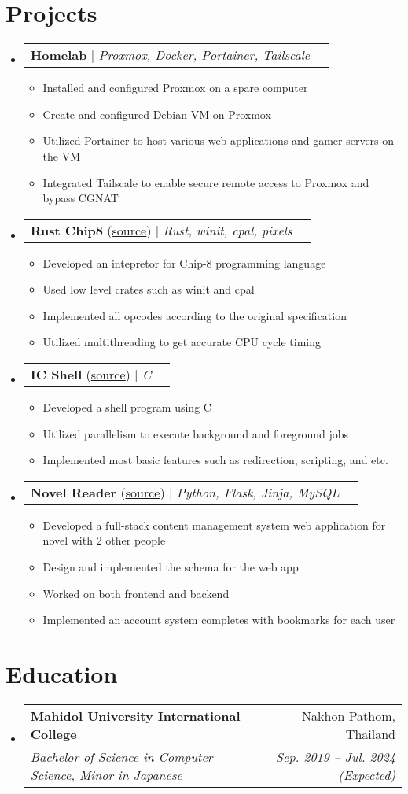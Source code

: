 \documentclass[letterpaper,11pt]{article}
\makeatletter
\newcommand{\resumeItem}[1]{
  \item\small{
    {#1 \vspace{-2pt}}
  }
}
\newcommand{\resumeSubheading}[4]{
  \vspace{-2pt}\item
    \begin{tabular*}{0.97\textwidth}[t]{l@{\extracolsep{\fill}}r}
      \textbf{#1} & #2 \\
      \textit{\small#3} & \textit{\small #4} \\
    \end{tabular*}\vspace{-7pt}
}
\newcommand{\resumeProjectHeading}[2]{
    \item
    \begin{tabular*}{0.97\textwidth}{l@{\extracolsep{\fill}}r}
      \small#1 & #2 \\
    \end{tabular*}\vspace{-7pt}
}
\newcommand{\resumeSubHeadingListStart}{\begin{itemize}[leftmargin=0.15in, label={}]}
\newcommand{\resumeSubHeadingListEnd}{\end{itemize}}
\newcommand{\resumeItemListStart}{\begin{itemize}}
\newcommand{\resumeItemListEnd}{\end{itemize}\vspace{-5pt}}
\makeatother
\begin{document}
\section{Projects}
    \resumeSubHeadingListStart
      \resumeProjectHeading
        {\textbf{Homelab} $|$ \emph{Proxmox, Docker, Portainer, Tailscale}}{}
        \resumeItemListStart
          \resumeItem{Installed and configured Proxmox on a spare computer}
          \resumeItem{Create and configured Debian VM on Proxmox}
          \resumeItem{Utilized Portainer to host various web applications and gamer servers on the VM }
          \resumeItem{Integrated Tailscale to enable secure remote access to Proxmox and bypass CGNAT}
        \resumeItemListEnd
      \resumeProjectHeading
        {\textbf{Rust Chip8} (\href{https://github.com/fordkuppp/rust-chip8}{\underline{source}}) $|$ \emph{Rust, winit, cpal, pixels}}{}
        \resumeItemListStart
          \resumeItem{Developed an intepretor for Chip-8 programming language}
          \resumeItem{Used low level crates such as winit and cpal}
          \resumeItem{Implemented all opcodes according to the original specification}
          \resumeItem{Utilized multithreading to get accurate CPU cycle timing}
        \resumeItemListEnd
      \resumeProjectHeading
        {\textbf{IC Shell} (\href{https://github.com/fordkuppp/icsh}{\underline{source}}) $|$ \emph{C}}{}
        \resumeItemListStart
          \resumeItem{Developed a shell program using C }
          \resumeItem{Utilized parallelism to execute background and foreground jobs }
          \resumeItem{Implemented most basic features such as redirection, scripting, and etc. }
        \resumeItemListEnd
      \resumeProjectHeading
        {\textbf{Novel Reader} (\href{https://github.com/fordkuppp/novel-reader}{\underline{source}}) $|$ \emph{Python, Flask, Jinja, MySQL}}{}
        \resumeItemListStart
          \resumeItem{Developed a full-stack content management system web application for novel with 2 other people}
          \resumeItem{Design and implemented the schema for the web app}
          \resumeItem{Worked on both frontend and backend}
          \resumeItem{Implemented an account system completes with bookmarks for each user}
        \resumeItemListEnd
    \resumeSubHeadingListEnd

\section{Education}
  \resumeSubHeadingListStart
    \resumeSubheading
      {Mahidol University International College}{Nakhon Pathom, Thailand}
      {Bachelor of Science in Computer Science, Minor in Japanese}{Sep. 2019 -- Jul. 2024 (Expected)}
  \resumeSubHeadingListEnd
\end{document}
